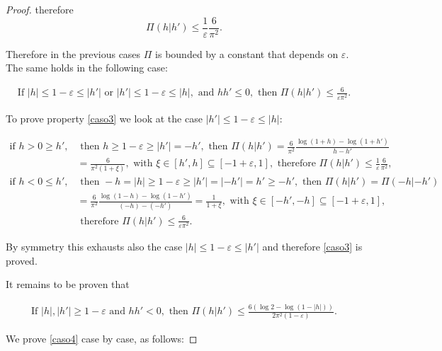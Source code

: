 \documentclass[a4paper,10pt,reqno]{amsart}
\numberwithin{equation}{subsection}
\numberwithin{figure}{subsection}
\begin{document}
\begin{proof}
therefore 
\[
\Pi(h|h')\leq\frac{1}{\varepsilon}\frac{6}{\pi^2}.
\]

Therefore in the previous cases $\Pi$ is bounded by a constant that depends on $\varepsilon$.
The same holds in the following case:

\begin{align}\label{caso3}
\textrm{If }|h|\leq1-\varepsilon\leq|h'|\textrm{ or }|h'|\leq1-\varepsilon\leq|h|,\textrm{ and }hh'\leq0,\textrm{ then }\Pi(h|h')\leq\frac{6}{\varepsilon\pi^2}.
\end{align}

To prove property \eqref{caso3} we look at the case $|h'|\leq1-\varepsilon\leq|h|$:

{\footnotesize\begin{align*}
\textrm{if }h>0\geq h',&\textrm{ then } h\geq1-\varepsilon\geq|h'|=-h',\textrm{ then }\Pi(h|h')=\frac{6}{\pi^2}\frac{\log(1+h)-\log(1+h')}{h-h'}
\\
&=\frac{6}{\pi^2(1+\xi)},\textrm{ with }\xi\in[h',h]\subseteq[-1+\varepsilon,1],\textrm{ therefore }\Pi(h|h')\leq\frac{1}{\varepsilon}\frac{6}{\pi^2},
\\
\textrm{if }h<0\leq h',&\textrm{ then }-h=|h|\geq1-\varepsilon\geq|h'|=|-h'|=h'\geq-h',\textrm{ then }\Pi(h|h')=\Pi(-h|-h')
\\
&=\frac{6}{\pi^2}\frac{\log(1-h)-\log(1-h')}{(-h)-(-h')}=\frac{1}{1+\xi},\textrm{ with }\xi\in[-h',-h]\subseteq[-1+\varepsilon,1],
\\
&\textrm{ therefore }\Pi(h|h')\leq\frac{6}{\varepsilon\pi^2}.
\end{align*}}

By symmetry this exhausts also the case $|h|\leq1-\varepsilon\leq|h'|$ and therefore \eqref{caso3} is proved.

It remains to be proven that

\begin{align}\label{caso4}
\textrm{If }|h|,|h'|\geq1-\varepsilon\textrm{ and }hh'<0,\textrm{ then }\Pi(h|h')\leq\frac{6(\log 2-\log(1-|h|))}{2\pi^2(1-\varepsilon)}.
\end{align}

We prove \eqref{caso4} case by case, as follows:


\end{proof}
\end{document}
